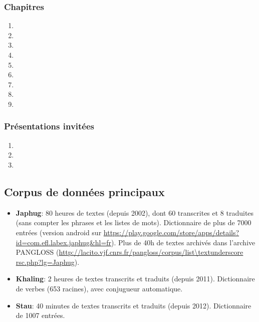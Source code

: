 \documentclass[oldfontcommands,oneside,a4paper,11pt]{article}
\begin{document}
   \subsubsection{Chapitres}
\begin{enumerate}
\item   {}  
\item   {}  
\item   {}  
\item   {}  
\item   {}   
\item   {}   
\item   {}   
\item   {}   
\item   {}   
  \end{enumerate}
  \subsubsection{Présentations invitées}
\begin{enumerate}
\item {}
\item {}
\item {}
\end{enumerate} 
\subsection{Corpus de données principaux}
\begin{itemize}
\item \textbf{Japhug}: 80 heures de textes (depuis 2002), dont 60 transcrites et 8 traduites (sans compter les phrases et les listes de mots). Dictionnaire de plus de 7000 entrées (version android sur \url{https://play.google.com/store/apps/details?id=com.efl.labex.japhug&hl=fr}). Plus de 40h de textes archivés dans l'archive PANGLOSS (\url{http://lacito.vjf.cnrs.fr/pangloss/corpus/list\textunderscore rsc.php?lg=Japhug}).
\item \textbf{Khaling}: 2 heures de textes transcrits et traduits (depuis 2011). Dictionnaire de verbes (653 racines), avec conjugueur automatique.
\item \textbf{Stau}: 40 minutes de textes transcrits et traduits (depuis 2012). Dictionnaire de 1007 entrées.
  \end{itemize}
  
\end{document}
